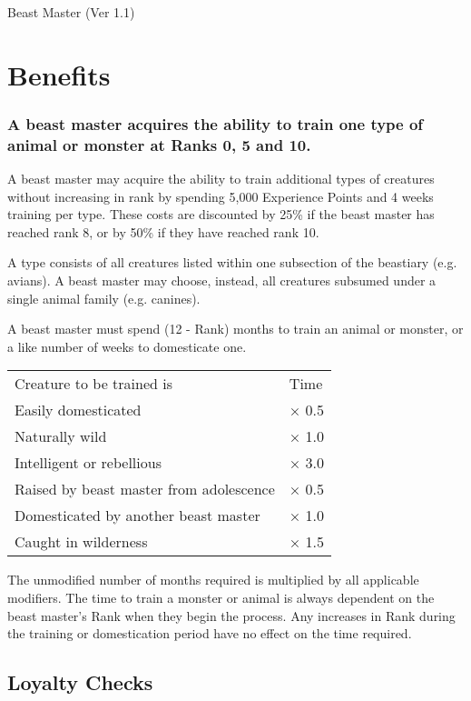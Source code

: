 \begin{Chapter}{Beast Master (Ver 1.1)}
\section{Benefits}

\subsubsection{A beast master acquires the ability to train one type of animal or
monster at Ranks 0, 5 and 10.}

A beast master may acquire the ability to train additional types of
creatures without increasing in rank by spending 5,000 Experience
Points and 4 weeks training per type. These costs are discounted by
25\% if the beast master has reached rank 8, or by 50\% if they have
reached rank 10.

A type consists of all creatures listed within one subsection of the
beastiary (e.g.  avians).  A beast master may choose, instead, all
creatures subsumed under a single animal family (e.g. canines).

A beast master must spend (12 - Rank) months to train an animal or
monster, or a like number of weeks to domesticate one.

\begin{tabularx}{\columnwidth}{Xl}
Creature to be trained is			& Time \\
Easily domesticated				& × 0.5 \\
Naturally wild					& × 1.0 \\
Intelligent or rebellious			& × 3.0 \\
Raised by beast master from adolescence 	& × 0.5 \\
Domesticated by another beast master		& × 1.0 \\
Caught in wilderness				& × 1.5 \\
\end{tabularx}

The unmodified number of months required is multiplied by all
applicable modifiers. The time to train a monster or animal is always
dependent on the beast master’s Rank when they begin the process.  Any
increases in Rank during the training or domestication period have no
effect on the time required.

\subsection{Loyalty Checks}


\end{Chapter}
